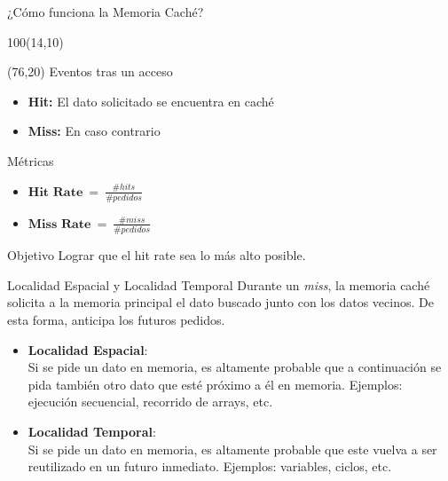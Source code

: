 \documentclass[aspectratio=169]{beamer}
\begin{document}
\begin{frame}{¿Cómo funciona la Memoria Caché?}
    \begin{textblock}{100}(14,10)  \end{textblock}
    \begin{textblock}{76}(76,20)
    Eventos tras un acceso
    \vskip 2pt
    \begin{itemize}
        \item \textbf{Hit:} El dato solicitado se encuentra en caché
        \item \textbf{Miss:} En caso contrario
    \end{itemize}
    \vskip 9pt
    Métricas
    \vskip 2pt
    \begin{itemize}
        \item $\textbf{Hit\ Rate}\ =\ \frac{\#hits}{\#pedidos}$
        \item $\textbf{Miss\ Rate}\ =\ \frac{\#miss}{\#pedidos}$
    \end{itemize}
    \vskip 15pt
    \begin{block}{Objetivo}
    Lograr que el \textcolor{naranjauca}{hit rate} sea lo más alto posible.
    \end{block}
    \end{textblock}
\end{frame}

\begin{frame}{Localidad Espacial y Localidad Temporal}
    Durante un \emph{miss}, la memoria caché solicita a la memoria principal el dato buscado junto con los datos vecinos. De esta forma, anticipa los futuros pedidos.
    \bigskip
    \begin{itemize}
    \item \textbf{Localidad Espacial}:\\
    Si se pide un dato en memoria, es altamente probable que a continuación se pida también otro dato que esté próximo a él en memoria. Ejemplos: ejecución secuencial, recorrido de arrays, etc.
    \vskip 15pt
    \item \textbf{Localidad Temporal}:\\
    Si se pide un dato en memoria, es altamente probable que este vuelva a ser reutilizado en un futuro inmediato. Ejemplos: variables, ciclos, etc.
    \end{itemize}
\end{frame}
\end{document}
